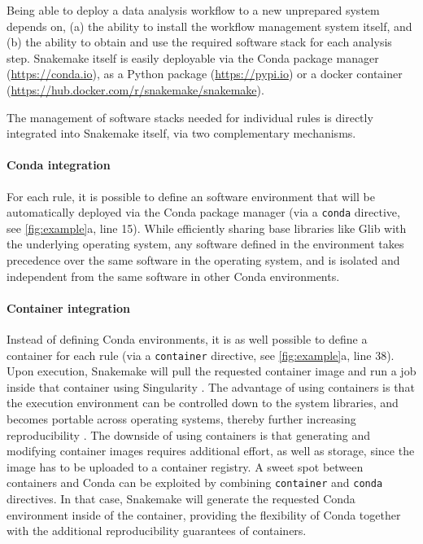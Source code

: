 \documentclass[parskip=half]{scrartcl}
\let\plainurl\url
\renewcommand{\url}[1]{\protect\plainurl{#1}}
\begin{document}
Being able to deploy a data analysis workflow to a new unprepared system depends on, (a) the ability to install the workflow management system itself, and (b) the ability to obtain and use the required software stack for each analysis step.
Snakemake itself is easily deployable via the Conda package manager (\url{https://conda.io}), as a Python package (\url{https://pypi.io}) or a docker container (\url{https://hub.docker.com/r/snakemake/snakemake}).

The management of software stacks needed for individual rules is directly integrated into Snakemake itself, via two complementary mechanisms.

\paragraph{Conda integration}

For each rule, it is possible to define an software environment that will be automatically deployed via the Conda package manager (via a \lstinline!conda! directive, see \autoref{fig:example}a, line 15).
While efficiently sharing base libraries like Glib with the underlying operating system, any software defined in the environment takes precedence over the same software in the operating system, and is isolated and independent from the same software in other Conda environments.

\paragraph{Container integration}

Instead of defining Conda environments, it is as well possible to define a container for each rule (via a \lstinline!container! directive, see \autoref{fig:example}a, line 38).
Upon execution, Snakemake will pull the requested container image and run a job inside that container using Singularity \parencite{kurtzer_singularity_2017}.
The advantage of using containers is that the execution environment can be controlled down to the system libraries, and becomes portable across operating systems, thereby further increasing reproducibility \parencite{gruning_practical_2018}.
The downside of using containers is that generating and modifying container images requires additional effort, as well as storage, since the image has to be uploaded to a container registry.
A sweet spot between containers and Conda can be exploited by combining \lstinline!container! and \lstinline!conda! directives.
In that case, Snakemake will generate the requested Conda environment inside of the container, providing the flexibility of Conda together with the additional reproducibility guarantees of containers.
\end{document}
